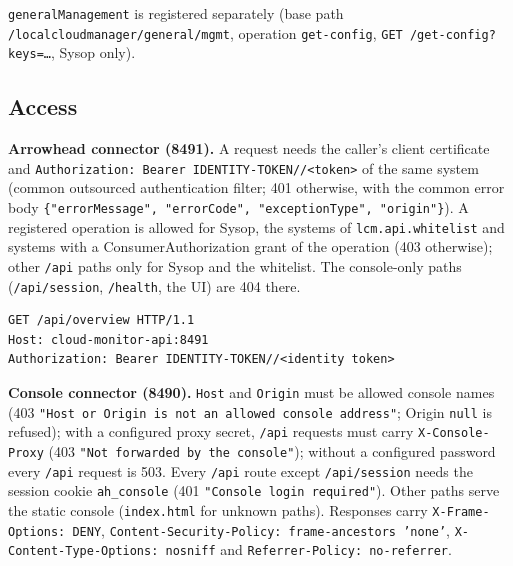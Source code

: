 \documentclass[a4paper]{arrowhead}
\begin{document}
\texttt{general\allowbreak{}Management} is registered separately (base path \texttt{/\allowbreak{}localcloudmanager/\allowbreak{}general/\allowbreak{}mgmt}, operation \texttt{get-\allowbreak{}config}, \texttt{GET /\allowbreak{}get-\allowbreak{}config?\allowbreak{}keys=\ldots}, Sysop only).

\subsection{Access}

\textbf{Arrowhead connector (8491).} A request needs the caller's client certificate and \texttt{Authorization:\allowbreak{} Bearer IDENTITY-\allowbreak{}TOKEN/\allowbreak{}/\allowbreak{}<token>} of the same system (common outsourced authentication filter; 401 otherwise, with the common error body \texttt{\{"errorMessage", "errorCode", "exceptionType", "origin"\}}). A registered operation is allowed for Sysop, the systems of \texttt{lcm.\allowbreak{}api.\allowbreak{}whitelist} and systems with a ConsumerAuthorization grant of the operation (403 otherwise); other \texttt{/api} paths only for Sysop and the whitelist. The console-only paths (\texttt{/api/\allowbreak{}session}, \texttt{/health}, the UI) are 404 there.

\begin{lstlisting}[label={lst:arrowhead},caption={An invocation on the Arrowhead connector.}]
GET /api/overview HTTP/1.1
Host: cloud-monitor-api:8491
Authorization: Bearer IDENTITY-TOKEN//<identity token>
\end{lstlisting}

\textbf{Console connector (8490).} \texttt{Host} and \texttt{Origin} must be allowed console names (403 \texttt{"Host or Origin is not an allowed console address"}; Origin \texttt{null} is refused); with a configured proxy secret, \texttt{/api} requests must carry \texttt{X-\allowbreak{}Console-\allowbreak{}Proxy} (403 \texttt{"Not forwarded by the console"}); without a configured password every \texttt{/api} request is 503. Every \texttt{/api} route except \texttt{/api/\allowbreak{}session} needs the session cookie \texttt{ah\_\allowbreak{}console} (401 \texttt{"Console login required"}). Other paths serve the static console (\texttt{index.html} for unknown paths). Responses carry \texttt{X-\allowbreak{}Frame-\allowbreak{}Options:\allowbreak{} DENY}, \texttt{Content-\allowbreak{}Security-\allowbreak{}Policy:\allowbreak{} frame-\allowbreak{}ancestors 'none'}, \texttt{X-\allowbreak{}Content-\allowbreak{}Type-\allowbreak{}Options:\allowbreak{} nosniff} and \texttt{Referrer-\allowbreak{}Policy:\allowbreak{} no-\allowbreak{}referrer}.
\end{document}

